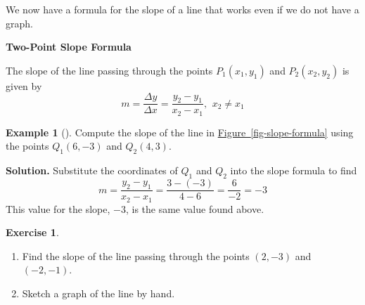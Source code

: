 \documentclass[10pt,]{book}
\theoremstyle{plain}
\theoremstyle{definition}
\theoremstyle{definition}
\newtheorem{example}[theorem]{Example}
\theoremstyle{definition}
\theoremstyle{definition}
\newtheorem{exercise}[theorem]{Exercise}
\numberwithin{equation}{section}
\begin{document}
    We now have a formula for the slope of a line that works even if we do not have a graph.
%
\begin{mdframed}[style=assemblage]%
\noindent\textbf{\large Two-Point Slope Formula}\label{assemblage-12}\par\medskip

        The slope of the line passing through the points \(P_1 (x_1, y_1)\) and \(P_2 (x_2, y_2)\) is given by
        \begin{equation*}m = \frac{\Delta y}{\Delta x}= \frac{y_2 − y_1}{x_2 − x_1} 
            \text{, }~x_2 \ne x_1\end{equation*}
\end{mdframed}
\begin{example}[]\label{example-two-point-slope}
Compute the slope of the line in \hyperref[fig-slope-formula]{Figure~\ref{fig-slope-formula}} using the points \(Q_1 (6, −3)\) and \(Q_2 (4, 3)\). %
\par\medskip\noindent%
\textbf{Solution.}\quad 
        Substitute the coordinates of \(Q_1\) and \(Q_2\) into the slope formula to find
        \begin{equation*}m = \frac{y_2 − y_1}{x_2 − x_1}= \frac{3 − (−3)}{4 − 6}
        = \frac{6}{-2}= −3\end{equation*}
        This value for the slope, \(−3\), is the same value found above.
    \end{example}
\begin{exercise}\label{exercise-two-point-slope}
\leavevmode%
\begin{enumerate}[label=*\alph**]
\item\hypertarget{li-153}{}Find the slope of the line passing through the points \((2, −3)\) and \(( −2, −1)\).\item\hypertarget{li-154}{}Sketch a graph of the line by hand.\end{enumerate}
\end{exercise}
\end{document}
